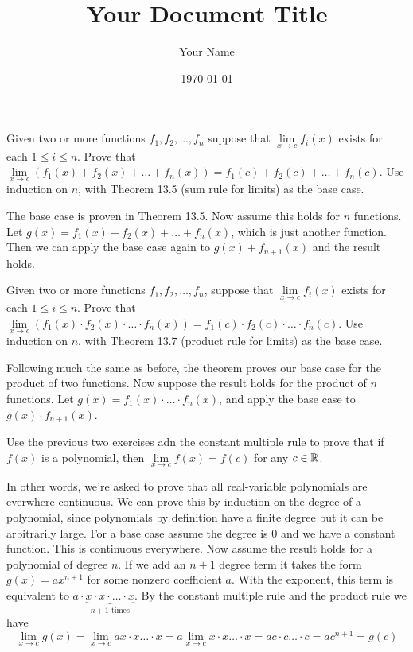\documentclass{article}
\title{Your Document Title}
\author{Your Name}
\date{\today} %
\begin{document}
\maketitle
\begin{problem}
Given two or more functions $f_1, f_2, \ldots, f_n$ suppose that $\lim\limits_{x\to c} f_i(x) $ exists for each $1 \leq i \leq n$. Prove that $\lim\limits_{x\to c} (f_1(x) + f_2(x) + \ldots + f_n(x)) = f_1(c) + f_2(c) + \ldots + f_n(c)$. Use induction on $n$, with Theorem 13.5 (sum rule for limits) as the base case.
\end{problem}

The base case is proven in Theorem 13.5. Now assume this holds for $n$ functions. Let $g(x) = f_1(x) + f_2(x) + \ldots + f_n(x)$, which is just another function. Then we can apply the base case again to $g(x) + f_{n+1}(x)$ and the result holds.

\begin{problem}
Given two or more functions $f_1, f_2, \ldots, f_n$, suppose that $\lim\limits_{x \to c}f_i(x)$ exists for each $1 \leq i \leq n$. Prove that $\lim\limits_{x \to c} (f_1(x) \cdot f_2(x) \cdot \ldots \cdot f_n(x)) = f_1(c) \cdot f_2(c) \cdot \ldots \cdot f_n(c)$. Use induction on $n$, with Theorem 13.7 (product rule for limits) as the base case.
\end{problem}

Following much the same as before, the theorem proves our base case for the product of two functions. Now suppose the result holds for the product of $n$ functions. Let $g(x) = f_1(x)\cdot \ldots \cdot f_n(x)$, and apply the base case to $g(x) \cdot f_{n+1}(x)$.

\begin{problem}
Use the previous two exercises adn the constant multiple rule to prove that if $f(x)$ is a polynomial, then $\lim\limits_{x \to c} f(x) = f(c)$ for any $c \in \mathbb{R}$.
\end{problem}

In other words, we're asked to prove that all real-variable polynomials are everwhere continuous. We can prove this by induction on the degree of a polynomial, since polynomials by definition have a finite degree but it can be arbitrarily large. For a base case assume the degree is 0 and we have a constant function. This is continuous everywhere. Now assume the result holds for a polynomial of degree $n$. If we add an $n+1$ degree term it takes the form $g(x) = ax^{n+1}$ for some nonzero coefficient $a$. With the exponent, this term is equivalent to $a\cdot \underbrace{x \cdot x \cdot \ldots \cdot x}_{\text{$n + 1$ times}}$. By the constant multiple rule and the product rule we have
$$\lim_{x \to c} g(x) = \lim_{x \to c} a x \cdot x \ldots \cdot x = a \lim_{x \to c} x \cdot x \ldots \cdot x = a c \cdot c \ldots \cdot c = a c^{n+1} = g(c)$$
\end{document}
